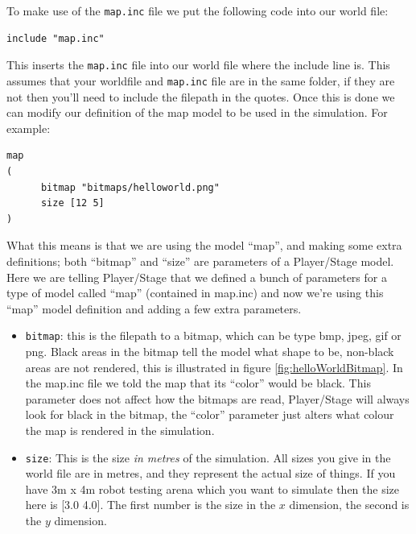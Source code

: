 \documentclass[a4paper]{article}
\newcommand{\plst}{Player/Stage\xspace}
\begin{document}
To make use of the \verb|map.inc| file we put the following code into our world file:
\begin{verbatim}
include "map.inc"
\end{verbatim}
This inserts the \verb|map.inc| file into our world file where the include line is. This assumes that your worldfile and \verb|map.inc| file are in the same folder, if they are not then you'll need to include the filepath in the quotes. Once this is done we can modify our definition of the map model to be used in the simulation. For example:
\begin{verbatim}
map
(
      bitmap "bitmaps/helloworld.png"
      size [12 5]	
)
\end{verbatim}
What this means is that we are using the model ``map'', and making some extra definitions; both ``bitmap'' and ``size'' are parameters of a \plst model. Here we are telling \plst that we defined a bunch of parameters for a type of model called ``map'' (contained in map.inc) and now we're using this ``map'' model definition and adding a few extra parameters.
\begin{itemize}
\item \verb|bitmap|: this is the filepath to a bitmap, which can be type bmp, jpeg, gif or png. Black areas in the bitmap tell the model what shape to be, non-black areas are not rendered, this is illustrated in figure \ref{fig:helloWorldBitmap}. In the map.inc file we told the map that its ``color'' would be black. This parameter does not affect how the bitmaps are read, \plst will always look for black in the bitmap, the ``color'' parameter just alters what colour the map is rendered in the simulation. 
\item \verb|size|: This is the size \emph{in metres} of the simulation. All sizes you give in the world file are in metres, and they represent the actual size of things. If you have 3m x 4m robot testing arena which you want to simulate then the size here is [3.0 4.0]. The first number is the size in the $x$ dimension, the second is the $y$ dimension.
\end{itemize}
\end{document}
